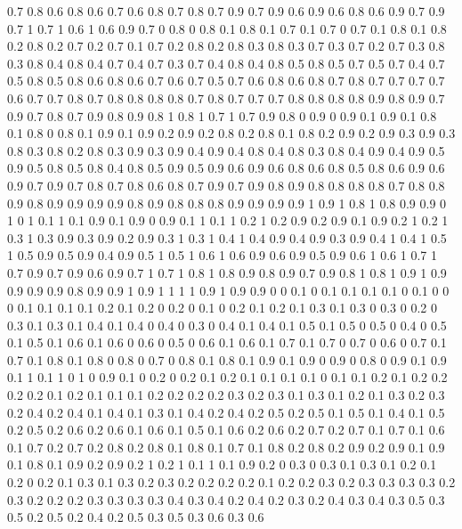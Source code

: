 0.7 0.8
0.6 0.8
0.6 0.7
0.6 0.8
0.7 0.8
0.7 0.9
0.7 0.9
0.6 0.9
0.6 0.8
0.6 0.9
0.7 0.9
0.7 1
0.7 1
0.6 1
0.6 0.9
0.7 0
0.8 0
0.8 0.1
0.8 0.1
0.7 0.1
0.7 0
0.7 0.1
0.8 0.1
0.8 0.2
0.8 0.2
0.7 0.2
0.7 0.1
0.7 0.2
0.8 0.2
0.8 0.3
0.8 0.3
0.7 0.3
0.7 0.2
0.7 0.3
0.8 0.3
0.8 0.4
0.8 0.4
0.7 0.4
0.7 0.3
0.7 0.4
0.8 0.4
0.8 0.5
0.8 0.5
0.7 0.5
0.7 0.4
0.7 0.5
0.8 0.5
0.8 0.6
0.8 0.6
0.7 0.6
0.7 0.5
0.7 0.6
0.8 0.6
0.8 0.7
0.8 0.7
0.7 0.7
0.7 0.6
0.7 0.7
0.8 0.7
0.8 0.8
0.8 0.8
0.7 0.8
0.7 0.7
0.7 0.8
0.8 0.8
0.8 0.9
0.8 0.9
0.7 0.9
0.7 0.8
0.7 0.9
0.8 0.9
0.8 1
0.8 1
0.7 1
0.7 0.9
0.8 0
0.9 0
0.9 0.1
0.9 0.1
0.8 0.1
0.8 0
0.8 0.1
0.9 0.1
0.9 0.2
0.9 0.2
0.8 0.2
0.8 0.1
0.8 0.2
0.9 0.2
0.9 0.3
0.9 0.3
0.8 0.3
0.8 0.2
0.8 0.3
0.9 0.3
0.9 0.4
0.9 0.4
0.8 0.4
0.8 0.3
0.8 0.4
0.9 0.4
0.9 0.5
0.9 0.5
0.8 0.5
0.8 0.4
0.8 0.5
0.9 0.5
0.9 0.6
0.9 0.6
0.8 0.6
0.8 0.5
0.8 0.6
0.9 0.6
0.9 0.7
0.9 0.7
0.8 0.7
0.8 0.6
0.8 0.7
0.9 0.7
0.9 0.8
0.9 0.8
0.8 0.8
0.8 0.7
0.8 0.8
0.9 0.8
0.9 0.9
0.9 0.9
0.8 0.9
0.8 0.8
0.8 0.9
0.9 0.9
0.9 1
0.9 1
0.8 1
0.8 0.9
0.9 0
1 0
1 0.1
1 0.1
0.9 0.1
0.9 0
0.9 0.1
1 0.1
1 0.2
1 0.2
0.9 0.2
0.9 0.1
0.9 0.2
1 0.2
1 0.3
1 0.3
0.9 0.3
0.9 0.2
0.9 0.3
1 0.3
1 0.4
1 0.4
0.9 0.4
0.9 0.3
0.9 0.4
1 0.4
1 0.5
1 0.5
0.9 0.5
0.9 0.4
0.9 0.5
1 0.5
1 0.6
1 0.6
0.9 0.6
0.9 0.5
0.9 0.6
1 0.6
1 0.7
1 0.7
0.9 0.7
0.9 0.6
0.9 0.7
1 0.7
1 0.8
1 0.8
0.9 0.8
0.9 0.7
0.9 0.8
1 0.8
1 0.9
1 0.9
0.9 0.9
0.9 0.8
0.9 0.9
1 0.9
1 1
1 1
0.9 1
0.9 0.9
0 0
0.1 0
0.1 0.1
0.1 0.1
0 0.1
0 0
0 0.1
0.1 0.1
0.1 0.2
0.1 0.2
0 0.2
0 0.1
0 0.2
0.1 0.2
0.1 0.3
0.1 0.3
0 0.3
0 0.2
0 0.3
0.1 0.3
0.1 0.4
0.1 0.4
0 0.4
0 0.3
0 0.4
0.1 0.4
0.1 0.5
0.1 0.5
0 0.5
0 0.4
0 0.5
0.1 0.5
0.1 0.6
0.1 0.6
0 0.6
0 0.5
0 0.6
0.1 0.6
0.1 0.7
0.1 0.7
0 0.7
0 0.6
0 0.7
0.1 0.7
0.1 0.8
0.1 0.8
0 0.8
0 0.7
0 0.8
0.1 0.8
0.1 0.9
0.1 0.9
0 0.9
0 0.8
0 0.9
0.1 0.9
0.1 1
0.1 1
0 1
0 0.9
0.1 0
0.2 0
0.2 0.1
0.2 0.1
0.1 0.1
0.1 0
0.1 0.1
0.2 0.1
0.2 0.2
0.2 0.2
0.1 0.2
0.1 0.1
0.1 0.2
0.2 0.2
0.2 0.3
0.2 0.3
0.1 0.3
0.1 0.2
0.1 0.3
0.2 0.3
0.2 0.4
0.2 0.4
0.1 0.4
0.1 0.3
0.1 0.4
0.2 0.4
0.2 0.5
0.2 0.5
0.1 0.5
0.1 0.4
0.1 0.5
0.2 0.5
0.2 0.6
0.2 0.6
0.1 0.6
0.1 0.5
0.1 0.6
0.2 0.6
0.2 0.7
0.2 0.7
0.1 0.7
0.1 0.6
0.1 0.7
0.2 0.7
0.2 0.8
0.2 0.8
0.1 0.8
0.1 0.7
0.1 0.8
0.2 0.8
0.2 0.9
0.2 0.9
0.1 0.9
0.1 0.8
0.1 0.9
0.2 0.9
0.2 1
0.2 1
0.1 1
0.1 0.9
0.2 0
0.3 0
0.3 0.1
0.3 0.1
0.2 0.1
0.2 0
0.2 0.1
0.3 0.1
0.3 0.2
0.3 0.2
0.2 0.2
0.2 0.1
0.2 0.2
0.3 0.2
0.3 0.3
0.3 0.3
0.2 0.3
0.2 0.2
0.2 0.3
0.3 0.3
0.3 0.4
0.3 0.4
0.2 0.4
0.2 0.3
0.2 0.4
0.3 0.4
0.3 0.5
0.3 0.5
0.2 0.5
0.2 0.4
0.2 0.5
0.3 0.5
0.3 0.6
0.3 0.6
